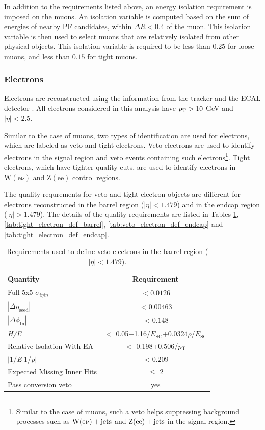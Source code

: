 In addition to the requirements listed above, an energy isolation requirement is imposed on the muons. An isolation variable 
is computed based on the sum of energies of nearby PF candidates, within $\Delta R < 0.4$ of the muon. This isolation
variable is then used to select muons that are relatively isolated from other physical objects. This isolation variable
is required to be less than $0.25$ for loose muons, and less than $0.15$ for tight muons.


\subsubsection{Electrons}
\label{subsec:electrons}

Electrons are reconstructed using the information from the tracker and the ECAL detector \cite{cms:elepho_paper}. All electrons
considered in this analysis have $p_{\textrm{T}} > 10$ GeV and $|\eta| < 2.5$.

Similar to the case of muons, two types of identification are used for electrons, which are labeled as veto and tight electrons.
Veto electrons are used to identify electrons in the signal region and veto events containing such 
electrons\footnote{Similar to the case of muons, such a veto helps suppressing background processes such as
$\textrm{W}(\textrm{e}\nu)+\textrm{jets}$ and $\mathrm{Z}(\textrm{ee})+\textrm{jets}$ in the signal region.}. 
Tight electrons, which have tighter
quality cuts, are used to identify electrons in $\textrm{W}(\textrm{e} \nu)$ and $\textrm{Z}(\textrm{ee})$ control regions.

The quality requrements for veto and tight electron objects are different for electrons reconstructed in the barrel region
($|\eta| < 1.479$) and in the endcap region ($|\eta| > 1.479$). The details of the quality requirements are listed in Tables \ref{tab:veto_electron_def_barrel},
\ref{tab:tight_electron_def_barrel}, \ref{tab:veto_electron_def_endcap} and \ref{tab:tight_electron_def_endcap}.

\begin{table}[htbp]
\centering
\def\arraystretch{1.2}

\begin{tabular}{|l|c|}
    \hline\hline
    Quantity & Requirement \\\hline
    Full 5x5 $\sigma_{i\eta i\eta}$ &  $< 0.0126$ \\
    $|\Delta\eta_{\mathrm{seed}}|$ & $< 0.00463$  \\
    $|\Delta\phi_{\mathrm{In}}|$ & $< 0.148$ \\
    \textit{H/E} & $<$ 0.05+1.16/$E_{\mathrm{SC}}$+0.0324$\rho$/$E_{\mathrm{SC}}$ \\
    Relative Isolation With EA & $<$ 0.198+0.506/$p_{\textrm{T}}$ \\
    $|$1/\textit{E}-1/\textit{p}$|$ & $< 0.209$ \\
    Expected Missing Inner Hits & $\leq$ 2 \\
    Pass conversion veto & yes \\
    \hline\hline
\end{tabular}
\caption{Requirements used to define veto electrons in the barrel region ($|\eta| < 1.479$).}
\label{tab:veto_electron_def_barrel}
\end{table}

